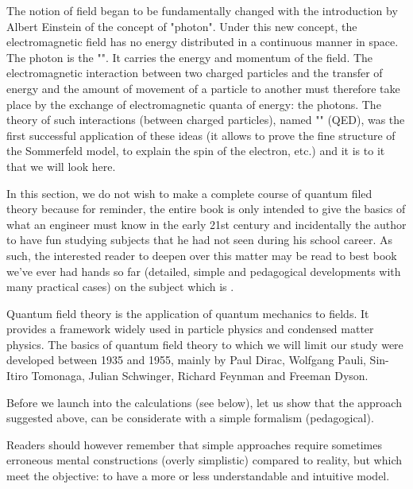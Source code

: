 	The notion of field began to be fundamentally changed with the introduction by Albert Einstein of the concept of "photon". Under this new concept, the electromagnetic field has no energy distributed in a continuous manner in space. The photon is the "". It carries the energy and momentum of the field. The electromagnetic interaction between two charged particles and the transfer of energy and the amount of movement of a particle to another must therefore take place by the exchange of electromagnetic quanta of energy: the photons. The theory of such interactions (between charged particles), named "" (QED), was the first successful application of these ideas (it allows to prove the fine structure of the Sommerfeld model, to explain the spin of the electron, etc.) and it is to it that we will look here.
	
	In this section, we do not wish to make a complete course of quantum filed theory because for reminder, the entire book is only intended to give the basics of what an engineer must know in the early 21st century and incidentally the author to have fun studying subjects that he had not seen during his school career. As such, the interested reader to deepen over this matter may be read to best book we've ever had hands so far (detailed, simple and pedagogical developments with many practical cases) on the subject which is \cite{desai2010quantum}.
	
	\begin{tcolorbox}[title=Remark,colframe=black,arc=10pt]
	Quantum field theory is the application of quantum mechanics to fields. It provides a framework widely used in particle physics and condensed matter physics. The basics of quantum field theory to which we will limit our study were developed between 1935 and 1955, mainly by Paul Dirac, Wolfgang Pauli, Sin-Itiro Tomonaga, Julian Schwinger, Richard Feynman and Freeman Dyson.
	\end{tcolorbox}
	
	Before we launch into the calculations (see below), let us show that the approach suggested above, can be considerate with a simple formalism (pedagogical).
	
	Readers should however remember that simple approaches require sometimes erroneous mental constructions (overly simplistic) compared to reality, but which meet the objective: to have a more or less understandable and intuitive model.
	
